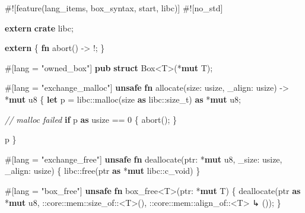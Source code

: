 \documentclass[a4paper,]{book}
\newenvironment{Shaded}{\begin{snugshade}}{\end{snugshade}}
\newcommand{\KeywordTok}[1]{\textcolor[rgb]{0.13,0.29,0.53}{\textbf{{#1}}}}
\newcommand{\DataTypeTok}[1]{\textcolor[rgb]{0.13,0.29,0.53}{{#1}}}
\newcommand{\DecValTok}[1]{\textcolor[rgb]{0.00,0.00,0.81}{{#1}}}
\newcommand{\StringTok}[1]{\textcolor[rgb]{0.31,0.60,0.02}{{#1}}}
\newcommand{\CommentTok}[1]{\textcolor[rgb]{0.56,0.35,0.01}{\textit{{#1}}}}
\newcommand{\AttributeTok}[1]{\textcolor[rgb]{0.77,0.63,0.00}{{#1}}}
\newcommand{\NormalTok}[1]{{#1}}
\begin{document}
\begin{Shaded}
\begin{Highlighting}[]
\AttributeTok{#![}\NormalTok{feature}\AttributeTok{(}\NormalTok{lang_items}\AttributeTok{,} \NormalTok{box_syntax}\AttributeTok{,} \NormalTok{start}\AttributeTok{,} \NormalTok{libc}\AttributeTok{)]}
\AttributeTok{#![}\NormalTok{no_std}\AttributeTok{]}

\KeywordTok{extern} \KeywordTok{crate} \NormalTok{libc;}

\KeywordTok{extern} \NormalTok{\{}
    \KeywordTok{fn} \NormalTok{abort() -> !;}
\NormalTok{\}}

\AttributeTok{#[}\NormalTok{lang }\AttributeTok{=} \StringTok{"owned_box"}\AttributeTok{]}
\KeywordTok{pub} \KeywordTok{struct} \DataTypeTok{Box}\NormalTok{<T>(*}\KeywordTok{mut} \NormalTok{T);}

\AttributeTok{#[}\NormalTok{lang }\AttributeTok{=} \StringTok{"exchange_malloc"}\AttributeTok{]}
\KeywordTok{unsafe} \KeywordTok{fn} \NormalTok{allocate(size: }\DataTypeTok{usize}\NormalTok{, _align: }\DataTypeTok{usize}\NormalTok{) -> *}\KeywordTok{mut} \DataTypeTok{u8} \NormalTok{\{}
    \KeywordTok{let} \NormalTok{p = libc::malloc(size }\KeywordTok{as} \NormalTok{libc::}\DataTypeTok{size_t}\NormalTok{) }\KeywordTok{as} \NormalTok{*}\KeywordTok{mut} \DataTypeTok{u8}\NormalTok{;}

    \CommentTok{// malloc failed}
    \KeywordTok{if} \NormalTok{p }\KeywordTok{as} \DataTypeTok{usize} \NormalTok{== }\DecValTok{0} \NormalTok{\{}
        \NormalTok{abort();}
    \NormalTok{\}}

    \NormalTok{p}
\NormalTok{\}}

\AttributeTok{#[}\NormalTok{lang }\AttributeTok{=} \StringTok{"exchange_free"}\AttributeTok{]}
\KeywordTok{unsafe} \KeywordTok{fn} \NormalTok{deallocate(ptr: *}\KeywordTok{mut} \DataTypeTok{u8}\NormalTok{, _size: }\DataTypeTok{usize}\NormalTok{, _align: }\DataTypeTok{usize}\NormalTok{) \{}
    \NormalTok{libc::free(ptr }\KeywordTok{as} \NormalTok{*}\KeywordTok{mut} \NormalTok{libc::}\DataTypeTok{c_void}\NormalTok{)}
\NormalTok{\}}

\AttributeTok{#[}\NormalTok{lang }\AttributeTok{=} \StringTok{"box_free"}\AttributeTok{]}
\KeywordTok{unsafe} \KeywordTok{fn} \NormalTok{box_free<T>(ptr: *}\KeywordTok{mut} \NormalTok{T) \{}
    \NormalTok{deallocate(ptr }\KeywordTok{as} \NormalTok{*}\KeywordTok{mut} \DataTypeTok{u8}\NormalTok{, ::core::mem::size_of::<T>(), ::core::mem::align_of::<T>}
\NormalTok{↳ ());}
\NormalTok{\}}


\end{Highlighting}
\end{Shaded}
\end{document}
